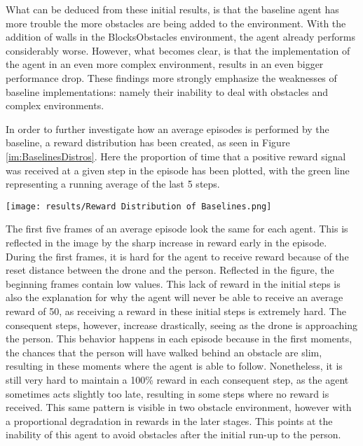 What can be deduced from these initial results, is that the baseline agent 
has more trouble the more obstacles are being added to the environment. With 
the addition of walls in the BlocksObstacles environment, the agent already 
performs considerably worse. However, what becomes clear, is that the
implementation of the agent in an even more complex environment, results in 
an even bigger performance drop. These findings more strongly emphasize 
the weaknesses of baseline implementations: namely their inability to 
deal with obstacles and complex environments. 

In order to further 
investigate how an average episodes is performed by the baseline, a 
reward distribution has been created, as seen in Figure \ref{im:BaselinesDistros}. 
Here the proportion of time that a positive reward signal was received at a 
given step in the episode has been plotted, with the green line representing 
a running average of the last 5 steps. 

\begin{Figure}
    \centering
    \texttt{[image: results/Reward Distribution of Baselines.png]}
    \label{im:BaselinesDistros}
\end{Figure}

The first five frames of an average episode look the same for each agent. This is 
reflected in the image by the sharp increase in reward early in the episode. 
During the first frames, it is hard for the agent to receive  
reward because of the reset distance between the drone and the person. 
Reflected in the figure, the beginning frames contain low values. This 
lack of reward in the initial steps is also the explanation for why the agent 
will never be able to receive an average reward of 50, as receiving a reward 
in these initial steps is extremely hard. The consequent steps,
however, increase drastically, seeing as the drone is approaching the person. 
This behavior happens in each episode because in the first moments, the chances 
that the person will have walked behind an obstacle are slim, resulting in these moments 
where the agent is able to follow. Nonetheless,
it is still very hard to maintain a 100\% reward in each consequent step, as the agent 
sometimes acts slightly too late, resulting in some steps where no reward is received. 
This same pattern is visible in two obstacle environment, however with a proportional 
degradation in rewards in the later stages. This points at the inability of this 
agent to avoid obstacles after the initial run-up to the person. 

